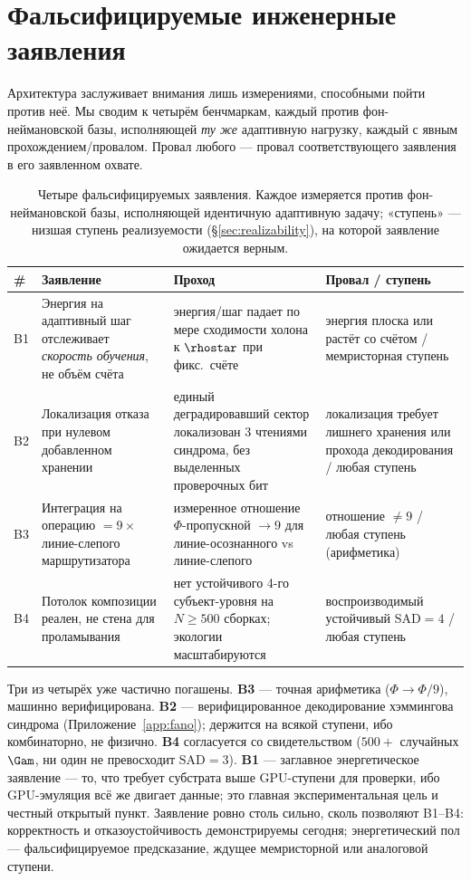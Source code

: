 \section{Фальсифицируемые инженерные заявления}
\label{sec:benchmarks}

Архитектура заслуживает внимания лишь измерениями, способными пойти против неё.
Мы сводим \TALOS{} к четырём бенчмаркам, каждый против фон-неймановской базы,
исполняющей \emph{ту же} адаптивную нагрузку, каждый с явным прохождением/провалом.
Провал любого --- провал соответствующего заявления в его заявленном охвате.

\begin{table}[H]
\centering\small
\caption{Четыре фальсифицируемых заявления. Каждое измеряется против
фон-неймановской базы, исполняющей идентичную адаптивную задачу; «ступень» ---
низшая ступень реализуемости (\S\ref{sec:realizability}), на которой заявление
ожидается верным.}
\label{tab:benchmarks}
\begin{tabular}{@{}p{0.5cm}p{3.5cm}p{3.9cm}p{3.6cm}@{}}
\toprule
\textbf{\#} & \textbf{Заявление} & \textbf{Проход} & \textbf{Провал / ступень} \\
\midrule
B1 & Энергия на адаптивный шаг отслеживает \emph{скорость обучения}, не объём счёта &
    энергия/шаг падает по мере сходимости холона к $\rhostar$ при фикс.\ счёте &
    энергия плоска или растёт со счётом / мемристорная ступень \\
B2 & Локализация отказа при нулевом добавленном хранении &
    единый деградировавший сектор локализован 3 чтениями синдрома, без выделенных проверочных бит &
    локализация требует лишнего хранения или прохода декодирования / любая ступень \\
B3 & Интеграция на операцию $=9\times$ линие-слепого маршрутизатора &
    измеренное отношение $\Phi$-пропускной $\to 9$ для линие-осознанного vs линие-слепого &
    отношение $\ne 9$ / любая ступень (арифметика) \\
B4 & Потолок композиции реален, не стена для проламывания &
    нет устойчивого 4-го субъект-уровня на $N\!\ge\!500$ сборках; экологии масштабируются &
    воспроизводимый устойчивый $\mathrm{SAD}=4$ / любая ступень \\
\bottomrule
\end{tabular}
\end{table}

Три из четырёх уже частично погашены. \textbf{B3} --- точная арифметика
($\Phi\to\Phi/9$), машинно верифицирована. \textbf{B2} --- верифицированное
декодирование хэммингова синдрома (Приложение~\ref{app:fano}); держится на всякой
ступени, ибо комбинаторно, не физично. \textbf{B4} согласуется со свидетельством
\SYNARC{} ($500+$ случайных $\Gam$, ни один не превосходит $\mathrm{SAD}=3$).
\textbf{B1} --- заглавное энергетическое заявление --- то, что требует субстрата
выше GPU-ступени для проверки, ибо GPU-эмуляция всё же двигает данные; это главная
экспериментальная цель и честный открытый пункт. Заявление \TALOS{} ровно столь
сильно, сколь позволяют B1--B4: корректность и отказоустойчивость демонстрируемы
сегодня; энергетический пол --- фальсифицируемое предсказание, ждущее мемристорной
или аналоговой ступени.
